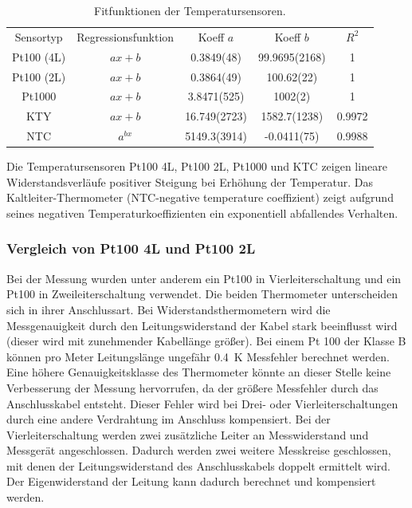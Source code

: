 \begin{table}[H]
	\centering
	\caption{Fitfunktionen der Temperatursensoren.}
	\label{tab:FitFun}
	\begin{tabular}{ccS[separate-uncertainty,table-figures-uncertainty = 1]S[separate-uncertainty,table-figures-uncertainty = 1]S}
		
		Sensortyp & Regressionsfunktion & {Koeff $a$} & {Koeff $b$} & {$R^2$} \\
		
		Pt100 (4L) & $ax+b$ & 0.3849(48) & 99.9695(2168) & 1 \\
		Pt100 (2L) & $ax+b$ & 0.3864(49) & 100.62(22) & 1 \\
		Pt1000 & $ax+b$ & 3.8471(525) & 1002(2) & 1 \\
		KTY & $ax+b$ & 16.749(2723) & 1582.7(1238) & 0.9972 \\
		NTC & $a^{bx}$ & 5149.3(3914) & -0.0411(75) & 0.9988 \\
		
	\end{tabular} 
\end{table}

Die Temperatursensoren Pt100 4L, Pt100 2L, Pt1000 und KTC zeigen lineare Widerstandsverläufe positiver Steigung bei Erhöhung der Temperatur. Das Kaltleiter-Thermometer (NTC-negative temperature coeffizient) zeigt aufgrund seines negativen Temperaturkoeffizienten ein exponentiell abfallendes Verhalten. 

\subsubsection{Vergleich von Pt100 4L und Pt100 2L}

Bei der Messung wurden unter anderem ein Pt100 in Vierleiterschaltung und ein Pt100 in Zweileiterschaltung verwendet. Die beiden Thermometer unterscheiden sich in ihrer Anschlussart. Bei Widerstandsthermometern wird die Messgenauigkeit durch den Leitungswiderstand der Kabel stark beeinflusst wird (dieser wird mit zunehmender Kabellänge größer). Bei einem Pt 100 der Klasse B können pro Meter Leitungslänge ungefähr \SI{0,4}{\kelvin} Messfehler berechnet werden. Eine höhere Genauigkeitsklasse des Thermometer könnte an dieser Stelle keine Verbesserung der Messung hervorrufen, da der größere Messfehler durch das Anschlusskabel entsteht. 
Dieser Fehler wird bei Drei- oder Vierleiterschaltungen durch eine andere Verdrahtung im Anschluss kompensiert. Bei der Vierleiterschaltung werden zwei zusätzliche Leiter an Messwiderstand und Messgerät angeschlossen. Dadurch werden zwei weitere Messkreise geschlossen, mit denen der Leitungswiderstand des Anschlusskabels doppelt ermittelt wird. Der Eigenwiderstand der Leitung kann dadurch berechnet und kompensiert werden.

